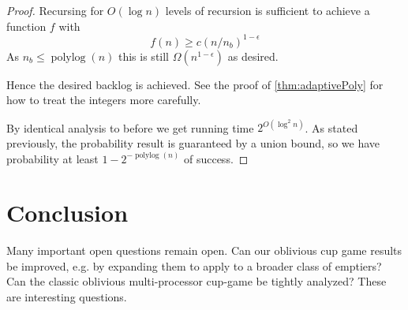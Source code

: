 \documentclass[twocolumn]{article}[10pt]
\DeclareMathOperator{\polylog}{\text{polylog}}
\begin{document}
\begin{proof}
  Recursing for $O(\log n)$ levels of recursion is sufficient to achieve a function $f$ with 
  $$f(n) \ge c(n/n_b)^{1-\epsilon}$$
  As $n_b \le \polylog(n)$ this is still $\Omega(n^{1-\epsilon})$ as desired.

  Hence the desired backlog is achieved. See the proof of
  \cref{thm:adaptivePoly} for how to treat the integers more carefully.

  By identical analysis to before we get running time $2^{O(\log^2 n)}$.
  As stated previously, the probability result is guaranteed by a union bound,
  so we have probability at least $1-2^{-\polylog(n)}$ of success.
\end{proof}


\section{Conclusion}
Many important open questions remain open. Can our oblivious cup game results
be improved, e.g. by expanding them to apply to a broader class of emptiers?
Can the classic oblivious multi-processor cup-game be tightly analyzed?
These are interesting questions.



\end{document}
